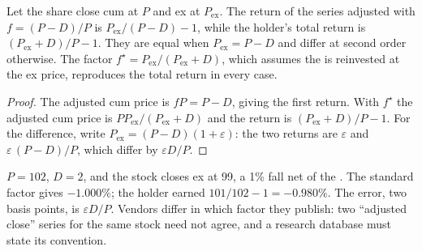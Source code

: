\begin{proposition}\label{prop:m1:shares-corporate-actions-indices:exact}
Let the share close cum at $P$ and ex at $P_{\mathrm{ex}}$. The return of the
series adjusted with $f = (P-D)/P$ is $P_{\mathrm{ex}}/(P-D) - 1$, while the
holder's total return is $(P_{\mathrm{ex}}+D)/P - 1$. They are equal when
$P_{\mathrm{ex}} = P - D$ and differ at second order otherwise. The factor
$f^\star = P_{\mathrm{ex}}/(P_{\mathrm{ex}}+D)$, which assumes the  is
reinvested at the ex price, reproduces the total return in every case.
\end{proposition}
\begin{proof}
The adjusted cum price is $fP = P - D$, giving the first return. With
$f^\star$ the adjusted cum price is $P P_{\mathrm{ex}}/(P_{\mathrm{ex}}+D)$ and
the return is $(P_{\mathrm{ex}}+D)/P - 1$. For the difference, write
$P_{\mathrm{ex}} = (P-D)(1+\varepsilon)$: the two returns are $\varepsilon$
and $\varepsilon\,(P-D)/P$, which differ by $\varepsilon D/P$.
\end{proof}

\begin{example}\label{ex:m1:shares-corporate-actions-indices:approx}
$P = 102$, $D = 2$, and the stock closes ex at 99, a 1\% fall net of the
. The standard factor gives $-1.000\%$; the holder earned $101/102 -
1 = -0.980\%$. The error, two basis points, is $\varepsilon D/P$. Vendors
differ in which factor they publish: two ``adjusted close'' series for the
same stock need not agree, and a research database must state its
convention.
\end{example}

